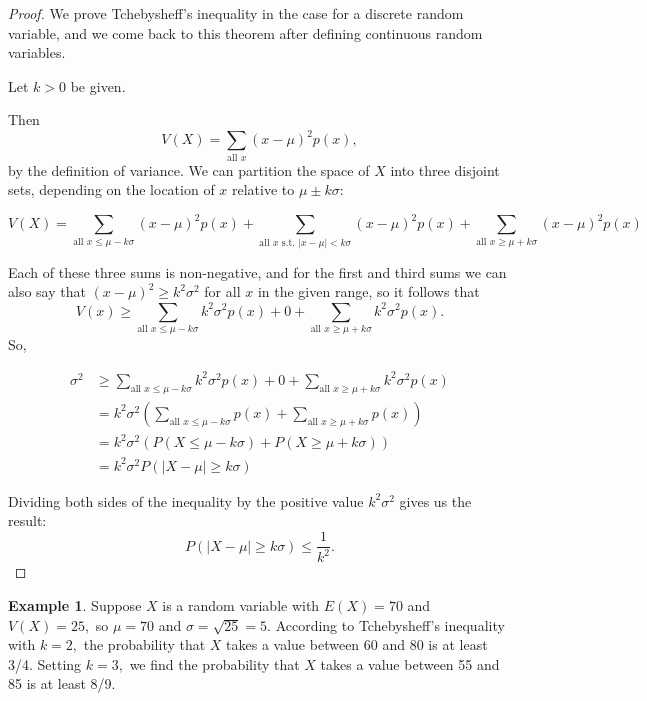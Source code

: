 \documentclass[
]{book}
\theoremstyle{definition}
\theoremstyle{definition}
\newtheorem{example}{Example}[chapter]
\theoremstyle{definition}
\theoremstyle{definition}
\theoremstyle{remark}
\begin{document}
\begin{proof}
We prove Tchebysheff's inequality in the case for a discrete random variable, and we come back to this theorem after defining continuous random variables.

Let \(k > 0\) be given.

Then \[V(X) = \sum_{\text{all }x} (x - \mu)^2 p(x),\] by the definition of variance. We can partition the space of \(X\) into three disjoint sets, depending on the location of \(x\) relative to \(\mu \pm k\sigma\):

\[V(X) = \sum_{\text{all } x \leq \mu - k\sigma} (x - \mu)^2 p(x) + 
\sum_{\text{all } x \text{ s.t. } |x-\mu|< k\sigma } (x - \mu)^2 p(x) + \sum_{\text{all } x \geq \mu + k\sigma} (x - \mu)^2 p(x)\]

Each of these three sums is non-negative, and for the first and third sums we can also say that \((x-\mu)^2 \geq k^2\sigma^2\) for all \(x\) in the given range, so it follows that \[V(x) \geq \sum_{\text{all } x \leq \mu - k\sigma} k^2\sigma^2 p(x) + 0 + \sum_{\text{all } x \geq \mu + k\sigma} k^2\sigma^2 p(x).\]
So,

\begin{align*}
\sigma^2 &\geq \sum_{\text{all } x \leq \mu - k\sigma} k^2\sigma^2 p(x) + 0 + \sum_{\text{all } x \geq \mu + k\sigma} k^2\sigma^2 p(x)  \\
  &= k^2\sigma^2 \left(\sum_{\text{all } x \leq \mu - k\sigma} p(x) + \sum_{\text{all } x \geq \mu + k\sigma} p(x) \right) \\
  &= k^2\sigma^2\left(P(X\leq \mu-k\sigma)+P(X \geq \mu+k\sigma)\right) \\
  &= k^2\sigma^2P(|X-\mu|\geq k\sigma)
\end{align*}

Dividing both sides of the inequality by the positive value \(k^2\sigma^2\) gives us the result:
\[P(|X-\mu| \geq k\sigma) \leq \frac{1}{k^2}.\]
\end{proof}

\begin{example}
\protect\hypertarget{exm:tcheby}{}\label{exm:tcheby}Suppose \(X\) is a random variable with \(E(X) = 70\) and \(V(X) = 25,\) so \(\mu = 70\) and \(\sigma = \sqrt{25} = 5\).
According to Tchebysheff's inequality with \(k = 2,\) the probability that \(X\) takes a value between 60 and 80 is at least 3/4. Setting \(k = 3,\) we find the probability that \(X\) takes a value between 55 and 85 is at least 8/9.
\end{example}
\end{document}
